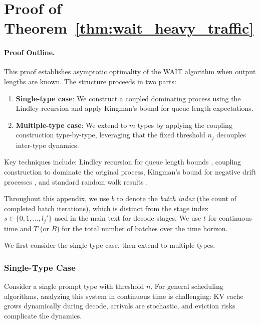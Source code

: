 
\section{Proof of Theorem~\ref{thm:wait_heavy_traffic}}\label{appexidx::proof of wait_heavy_traffic}

\paragraph{Proof Outline.}
This proof establishes asymptotic optimality of the WAIT algorithm when output lengths are known. The structure proceeds in two parts:
\begin{enumerate}
    \item \textbf{Single-type case}: We construct a coupled dominating process using the Lindley recursion and apply Kingman's bound for queue length expectations.
    \item \textbf{Multiple-type case}: We extend to $m$ types by applying the coupling construction type-by-type, leveraging that the fixed threshold $n_j$ decouples inter-type dynamics.
\end{enumerate}
Key techniques include: Lindley recursion for queue length bounds \citep[Proposition 6.3]{asmussen2003applied}, coupling construction to dominate the original process, Kingman's bound for negative drift processes \citep{kingman1962queues}, and standard random walk results \citep{strait1974maximum}.

Throughout this appendix, we use $b$ to denote the \emph{batch index} (the count of completed batch iterations), which is distinct from the stage index $s \in \{0, 1, \ldots, l_j'\}$ used in the main text for decode stages. We use $t$ for continuous time and $T$ (or $B$) for the total number of batches over the time horizon.

We first consider the single-type case, then extend to multiple types.

\subsubsection{Single-Type Case}

Consider a single prompt type with threshold $n$. For general scheduling algorithms, analyzing this system in continuous time is challenging: KV cache grows dynamically during decode, arrivals are stochastic, and eviction risks complicate the dynamics.

